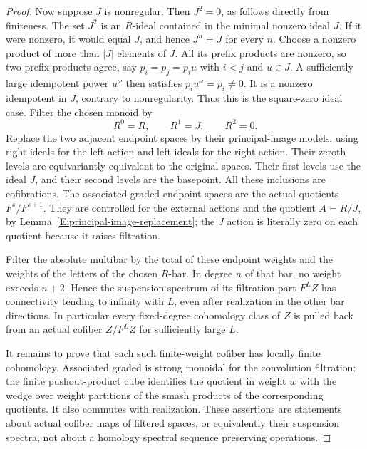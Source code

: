 \begin{proof}
Now suppose $J$ is nonregular.  Then $J^2=0$, as follows directly
from finiteness.  The set $J^2$ is an $R$-ideal contained in the
minimal nonzero ideal $J$.  If it were nonzero, it would equal $J$,
and hence $J^n=J$ for every $n$.  Choose a nonzero product of more
than $|J|$ elements of $J$.  All its prefix products are nonzero,
so two prefix products agree, say $p_i=p_j=p_i u$ with $i<j$ and
$u\in J$.  A sufficiently large idempotent power $u^\omega$ then
satisfies $p_i u^\omega=p_i\ne0$.  It is a nonzero idempotent in
$J$, contrary to nonregularity.  Thus this is the square-zero ideal
case.  Filter the chosen monoid by
\[
 R^0=R,\qquad R^1=J,\qquad R^2=0.
\]
Replace the two adjacent endpoint spaces by their principal-image
models, using right ideals for the left action and left ideals for
the right action.  Their zeroth levels are equivariantly equivalent
to the original spaces.  Their first levels use the ideal $J$, and
their second levels are the basepoint.  All these inclusions are
cofibrations.  The associated-graded endpoint spaces are the actual
quotients $F^s/F^{s+1}$.  They are controlled for the external actions
and the quotient $A=R/J$, by
Lemma~\ref{E:principal-image-replacement}; the $J$ action is literally
zero on each quotient because it raises filtration.

Filter the absolute multibar by the total of these endpoint weights
and the weights of the letters of the chosen $R$-bar.  In degree $n$
of that bar, no weight exceeds $n+2$.  Hence the suspension spectrum
of its filtration part $F^LZ$ has connectivity tending to infinity
with $L$, even after realization in the other bar directions.  In
particular every fixed-degree cohomology class of $Z$ is pulled back
from an actual cofiber $Z/F^LZ$ for sufficiently large $L$.

It remains to prove that each such finite-weight cofiber has locally
finite cohomology.  Associated graded is strong monoidal for the
convolution filtration: the finite pushout-product cube identifies
the quotient in weight $w$ with the wedge over weight partitions of
the smash products of the corresponding quotients.  It also commutes
with realization.  These assertions are statements about actual
cofiber maps of filtered spaces, or equivalently their suspension
spectra, not about a homology spectral sequence preserving operations.


\end{proof}
